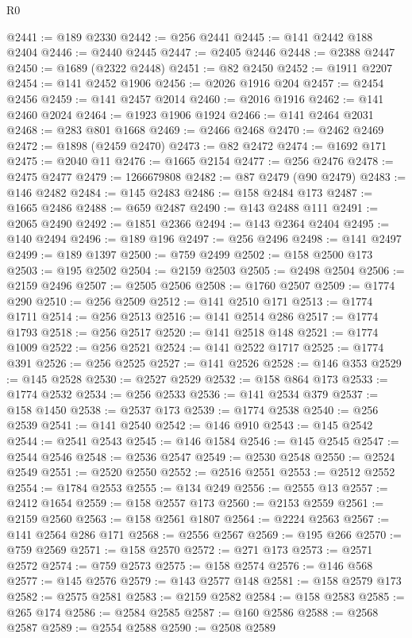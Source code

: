 \begin{lexlean}{R0}
\begin{coremodule}
@2441 := @189 @2330
@2442 := @256 @2441
@2445 := @141 @2442 @188 @2404
@2446 := @2440 @2445
@2447 := @2405 @2446
@2448 := @2388 @2447
@2450 := @1689 (@2322 @2448)
@2451 := @82 @2450
@2452 := @1911 @2207
@2454 := @141 @2452 @1906
@2456 := @2026 @1916 @204
@2457 := @2454 @2456
@2459 := @141 @2457 @2014
@2460 := @2016 @1916
@2462 := @141 @2460 @2024
@2464 := @1923 @1906 @1924
@2466 := @141 @2464 @2031
@2468 := @283 @801 @1668
@2469 := @2466 @2468
@2470 := @2462 @2469
@2472 := @1898 (@2459 @2470)
@2473 := @82 @2472
@2474 := @1692 @171
@2475 := @2040 @11
@2476 := @1665 @2154
@2477 := @256 @2476
@2478 := @2475 @2477
@2479 := 1266679808
@2482 := @87 @2479 (@90 @2479)
@2483 := @146 @2482
@2484 := @145 @2483
@2486 := @158 @2484 @173
@2487 := @1665 @2486
@2488 := @659 @2487
@2490 := @143 @2488 @111
@2491 := @2065 @2490
@2492 := @1851 @2366
@2494 := @143 @2364 @2404
@2495 := @140 @2494
@2496 := @189 @196
@2497 := @256 @2496
@2498 := @141 @2497
@2499 := @189 @1397
@2500 := @759 @2499
@2502 := @158 @2500 @173
@2503 := @195 @2502
@2504 := @2159 @2503
@2505 := @2498 @2504
@2506 := @2159 @2496
@2507 := @2505 @2506
@2508 := @1760 @2507
@2509 := @1774 @290
@2510 := @256 @2509
@2512 := @141 @2510 @171
@2513 := @1774 @1711
@2514 := @256 @2513
@2516 := @141 @2514 @286
@2517 := @1774 @1793
@2518 := @256 @2517
@2520 := @141 @2518 @148
@2521 := @1774 @1009
@2522 := @256 @2521
@2524 := @141 @2522 @1717
@2525 := @1774 @391
@2526 := @256 @2525
@2527 := @141 @2526
@2528 := @146 @353
@2529 := @145 @2528
@2530 := @2527 @2529
@2532 := @158 @864 @173
@2533 := @1774 @2532
@2534 := @256 @2533
@2536 := @141 @2534 @379
@2537 := @158 @1450
@2538 := @2537 @173
@2539 := @1774 @2538
@2540 := @256 @2539
@2541 := @141 @2540
@2542 := @146 @910
@2543 := @145 @2542
@2544 := @2541 @2543
@2545 := @146 @1584
@2546 := @145 @2545
@2547 := @2544 @2546
@2548 := @2536 @2547
@2549 := @2530 @2548
@2550 := @2524 @2549
@2551 := @2520 @2550
@2552 := @2516 @2551
@2553 := @2512 @2552
@2554 := @1784 @2553
@2555 := @134 @249
@2556 := @2555 @13
@2557 := @2412 @1654
@2559 := @158 @2557 @173
@2560 := @2153 @2559
@2561 := @2159 @2560
@2563 := @158 @2561 @1807
@2564 := @2224 @2563
@2567 := @141 @2564 @286 @171
@2568 := @2556 @2567
@2569 := @195 @266
@2570 := @759 @2569
@2571 := @158 @2570
@2572 := @271 @173
@2573 := @2571 @2572
@2574 := @759 @2573
@2575 := @158 @2574
@2576 := @146 @568
@2577 := @145 @2576
@2579 := @143 @2577 @148
@2581 := @158 @2579 @173
@2582 := @2575 @2581
@2583 := @2159 @2582
@2584 := @158 @2583
@2585 := @265 @174
@2586 := @2584 @2585
@2587 := @160 @2586
@2588 := @2568 @2587
@2589 := @2554 @2588
@2590 := @2508 @2589

\end{coremodule}
\end{lexlean}

